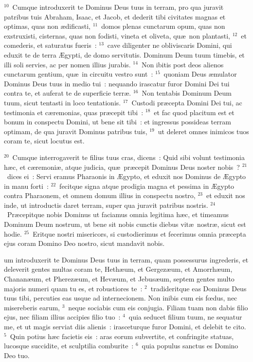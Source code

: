 ${}^{10}$~Cumque introduxerit te Dominus Deus tuus in terram, pro qua juravit patribus tuis Abraham, Isaac, et Jacob, et dederit tibi civitates magnas et optimas, quas non \ae dificasti,
${}^{11}$~domos plenas cunctarum opum, quas non exstruxisti, cisternas, quas non fodisti, vineta et oliveta, qu\ae\ non plantasti,
${}^{12}$~et comederis, et saturatus fueris~:
${}^{13}$~cave diligenter ne obliviscaris Domini, qui eduxit te de terra \AE gypti, de domo servitutis. Dominum Deum tuum timebis, et illi soli servies, ac per nomen illius jurabis.
${}^{14}$~Non ibitis post deos alienos cunctarum gentium, qu\ae\ in circuitu vestro sunt~:
${}^{15}$~quoniam Deus \ae mulator Dominus Deus tuus in medio tui~: nequando irascatur furor Domini Dei tui contra te, et auferat te de superficie terr\ae .
${}^{16}$~Non tentabis Dominum Deum tuum, sicut tentasti in loco tentationis.
${}^{17}$~Custodi pr\ae cepta Domini Dei tui, ac testimonia et c\ae remonias, quas pr\ae cepit tibi~:
${}^{18}$~et fac quod placitum est et bonum in conspectu Domini, ut bene sit tibi~: et ingressus possideas terram optimam, de qua juravit Dominus patribus tuis,
${}^{19}$~ut deleret omnes inimicos tuos coram te, sicut locutus est.


${}^{20}$~Cumque interrogaverit te filius tuus cras, dicens~: Quid sibi volunt testimonia h\ae c, et c\ae remoni\ae , atque judicia, qu\ae\ pr\ae cepit Dominus Deus noster nobis~?
${}^{21}$~dices ei~: Servi eramus Pharaonis in \AE gypto, et eduxit nos Dominus de \AE gypto in manu forti~:
${}^{22}$~fecitque signa atque prodigia magna et pessima in \AE gypto contra Pharaonem, et omnem domum illius in conspectu nostro,
${}^{23}$~et eduxit nos inde, ut introductis daret terram, super qua juravit patribus nostris.
${}^{24}$~Pr\ae cepitque nobis Dominus ut faciamus omnia legitima h\ae c, et timeamus Dominum Deum nostrum, ut bene sit nobis cunctis diebus vit\ae\ nostr\ae , sicut est hodie.
${}^{25}$~Eritque nostri misericors, si custodierimus et fecerimus omnia pr\ae cepta ejus coram Domino Deo nostro, sicut mandavit nobis.

\bchapter
{}um introduxerit te Dominus Deus tuus in terram, quam possessurus ingrederis, et deleverit gentes multas coram te, Heth\ae um, et Gergez\ae um, et Amorrh\ae um, Chanan\ae um, et Pherez\ae um, et Hev\ae um, et Jebus\ae um, septem gentes multo majoris numeri quam tu es, et robustiores te~:
${}^{2}$~tradideritque eas Dominus Deus tuus tibi, percuties eas usque ad internecionem. Non inibis cum eis fœdus, nec misereberis earum,
${}^{3}$~neque sociabis cum eis conjugia. Filiam tuam non dabis filio ejus, nec filiam illius accipies filio tuo~:
${}^{4}$~quia seducet filium tuum, ne sequatur me, et ut magis serviat diis alienis~: irasceturque furor Domini, et delebit te cito.
${}^{5}$~Quin potius h\ae c facietis eis~: aras eorum subvertite, et confringite statuas, lucosque succidite, et sculptilia comburite~:
${}^{6}$~quia populus sanctus es Domino Deo tuo.

